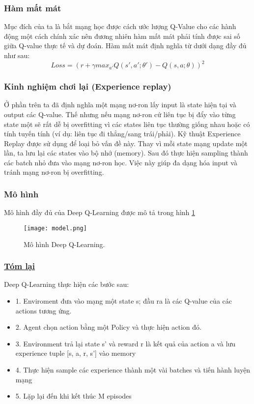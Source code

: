 \subsubsection{Hàm mất mát}
Mục đích của ta là bắt mạng học được cách ước lượng Q-Value cho các hành động một cách chính xác nên đương nhiên 
hàm mất mát phải tính được sai số giữa Q-value thực tế và dự đoán. Hàm mất mát định nghĩa từ dưới dạng đầy đủ 
như sau:
\begin{equation}
    \label{eq:lossf}
    Loss = (r + \gamma max_{a'}Q(s', a'; \theta') - Q(s, a; \theta))^2
\end{equation}
\subsubsection{Kinh nghiệm chơi lại (Experience replay)} 
Ở phần trên ta đã định nghĩa một mạng nơ-ron lấy input là state hiện tại và output các Q-value. 
Thế nhưng nếu mạng nơ-ron  cứ liên tục bị đẩy vào từng state một sẽ rất dễ bị overfitting 
vì các states liên tục thường giống nhau hoặc có tính tuyến tính (ví dụ: liên tục 
đi thẳng/sang trái/phải). Kỹ thuật Experience Replay được sử dụng để loại bỏ vấn đề này.
 Thay vì mỗi state mạng update một lần, ta lưu lại các states vào bộ nhớ (memory).
 Sau đó thực hiện sampling thành các batch nhỏ đưa vào mạng nơ-ron học. Việc này giúp đa 
 dạng hóa input và tránh mạng nơ-ron bị overfitting.
 \subsubsection{Mô hình}
 Mô hình đầy đủ của Deep Q-Learning được mô tả trong hình \ref{fig:deepqlearning}
 \begin{figure}[ht]
    \centering
    \texttt{[image: model.png]}
    \caption{Mô hình Deep Q-Learning.}
    \label{fig:deepqlearning}
\end{figure}
\subsubsection{\underline{Tóm lại}}
Deep Q-Learning thực hiện các bước sau:
\begin{itemize}
    \item 1. Enviroment đưa vào mạng một state s; đầu ra là các Q-value của các actions tương ứng.
    \item 2. Agent chọn action bằng một Policy và thực hiện action đó.
    \item 3. Environment trả lại state s' và reward r là kết quả của action a và lưu experience tuple [s, a, r, s'] vào memory
    \item 4. Thực hiện sample các experience thành một vài batches và tiến hành luyện mạng
    \item 5. Lặp lại đến khi kết thúc M episodes
\end{itemize}
